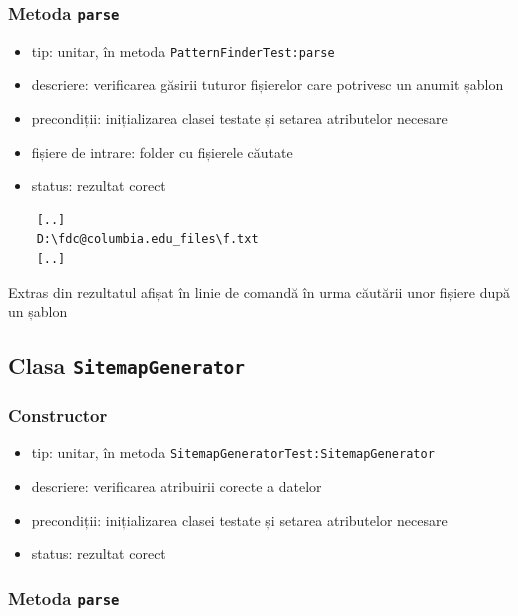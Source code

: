 \documentclass[12pt]{article}
\begin{document}
\subsubsection{Metoda \texttt{parse}}

\begin{itemize}
    \item tip: unitar, în metoda \texttt{PatternFinderTest:parse}
    \item descriere: verificarea găsirii tuturor fișierelor care potrivesc un anumit șablon
    \item precondiții: inițializarea clasei testate și setarea atributelor necesare
    \item fișiere de intrare: folder cu fișierele căutate
    \item status: rezultat corect
\end{itemize}

\vspace{0.3cm}
\begin{listing}[ht]
    \begin{verbatim}
	[..]
	D:\fdc@columbia.edu_files\f.txt
	[..]
    \end{verbatim}
    \caption{Extras din rezultatul afișat în linie de comandă în urma căutării unor fișiere după un șablon}
    \label{listing:1}
\end{listing}
\vspace{0.3cm}

\subsection{Clasa \texttt{SitemapGenerator}}

\subsubsection{Constructor}

\begin{itemize}
    \item tip: unitar, în metoda \texttt{SitemapGeneratorTest:SitemapGenerator}
    \item descriere: verificarea atribuirii corecte a datelor
    \item precondiții: inițializarea clasei testate și setarea atributelor necesare
    \item status: rezultat corect
\end{itemize}

\subsubsection{Metoda \texttt{parse}}
\end{document}
